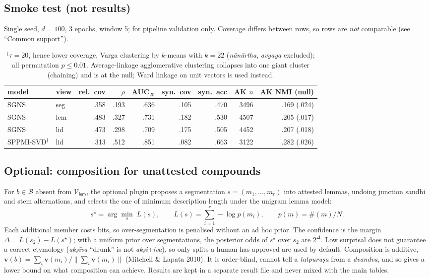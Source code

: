\documentclass[11pt,a4paper]{article}
\theoremstyle{remark}\newtheorem{remark}{Remark}
\newcommand{\Voc}{\mathcal{V}}          %
\newcommand{\B}{\mathcal{B}}            %
\newcommand{\cnt}{\#}                   %
\renewcommand{\v}[1]{\bm{#1}}           %
\newcommand{\vk}[1]{\textsf{#1}}         %
\begin{document}
\subsection{Smoke test (not results)}
Single seed, $d=100$, 3 epochs, window 5; for pipeline validation only.
Coverage differs between rows, so rows are \emph{not} comparable (see
``Common support'').
\begin{table}[h]\centering\small
\begin{tabular}{llrrrrrrr}
\toprule
model & view & rel.\ cov & $\rho$ & AUC$_{20}$ & syn.\ cov & syn.\ acc & AK $n$ & AK NMI (null)\\
\midrule
SGNS & \vk{seg} & .358 & .193 & .636 & .105 & .470 & 3496 & .169 (.024)\\
SGNS & \vk{lem} & .483 & .327 & .731 & .182 & .530 & 4507 & .205 (.017)\\
SGNS & \vk{lid} & .473 & .298 & .709 & .175 & .505 & 4452 & .207 (.018)\\
SPPMI-SVD$^\dagger$ & \vk{lid} & .313 & .512 & .851 & .082 & .663 & 3122 & .282 (.026)\\
\bottomrule
\end{tabular}
\caption{$^\dagger\tau=20$, hence lower coverage. Varga clustering by
$k$-means with $k=22$ (\emph{nānārtha}, \emph{avyaya} excluded); all
permutation $p\le0.01$. Average-linkage agglomerative clustering collapses
into one giant cluster (chaining) and is at the null; Ward linkage on unit
vectors is used instead.}
\end{table}

\subsection{Optional: composition for unattested compounds}\label{sec:compose}
For $b\in\B$ absent from $\Voc_{\vk{lem}}$, the optional plugin proposes a
segmentation $s=(m_1,\dots,m_r)$ into attested lemmas, undoing junction sandhi
and stem alternations, and selects the one of minimum description length
under the unigram lemma model:
\[
s^\star=\arg\min_{s}\;L(s),\qquad L(s)=\sum_{i=1}^{r}-\log p(m_i),\qquad
p(m)=\cnt(m)/N.
\]
Each additional member costs bits, so over-segmentation is penalised without
an ad hoc prior. The confidence is the margin $\Delta=L(s_2)-L(s^\star)$; with
a uniform prior over segmentations, the posterior odds of $s^\star$ over $s_2$
are $2^{\Delta}$. Low surprisal does not guarantee a correct etymology
(\emph{akṣīva} ``drunk'' is not \emph{akṣi}+\emph{iva}), so only splits a
human has approved are used by default. Composition is additive,
$\v{v}(b)=\sum_i\v{v}(m_i)/\|\sum_i\v{v}(m_i)\|$ (Mitchell \& Lapata 2010).
It is order-blind, cannot tell a \emph{tatpuruṣa} from a \emph{dvandva},
and so gives a lower bound on what composition can achieve. Results are kept
in a separate result file and never mixed with the main tables.
\end{document}
